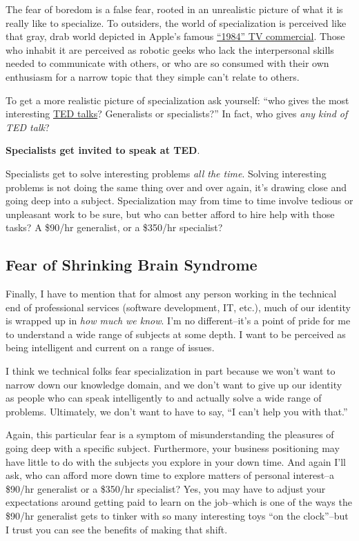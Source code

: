 The fear of boredom is a false fear, rooted in an unrealistic picture of what it is really like to specialize. To outsiders, the world of specialization is perceived like that gray, drab world depicted in Apple's famous \href{http://bit.ly/1xEXr8B}{``1984'' TV commercial}. Those who inhabit it are perceived as robotic geeks who lack the interpersonal skills needed to communicate with others, or who are so consumed with their own enthusiasm for a narrow topic that they simple can't relate to others.

To get a more realistic picture of specialization ask yourself: ``who gives the most interesting \href{http://ted.com}{TED talks}? Generalists or specialists?'' In fact, who gives \emph{any kind of TED talk}?

\textbf{Specialists get invited to speak at TED}.

Specialists get to solve interesting problems \emph{all the time}. Solving interesting problems is not doing the same thing over and over again, it's drawing close and going deep into a subject. Specialization may from time to time involve tedious or unpleasant work to be sure, but who can better afford to hire help with those tasks? A \$90/hr generalist, or a \$350/hr specialist?

\subsection{Fear of Shrinking Brain Syndrome}

Finally, I have to mention that for almost any person working in the technical end of professional services (software development, IT, etc.), much of our identity is wrapped up in \emph{how much we know}. I'm no different--it's a point of pride for me to understand a wide range of subjects at some depth. I want to be perceived as being intelligent and current on a range of issues.

I think we technical folks fear specialization in part because we won't want to narrow down our knowledge domain, and we don't want to give up our identity as people who can speak intelligently to and actually solve a wide range of problems. Ultimately, we don't want to have to say, ``I can't help you with that.''

Again, this particular fear is a symptom of misunderstanding the pleasures of going deep with a specific subject. Furthermore, your business positioning may have little to do with the subjects you explore in your down time. And again I'll ask, who can afford more down time to explore matters of personal interest--a \$90/hr generalist or a \$350/hr specialist? Yes, you may have to adjust your expectations around getting paid to learn on the job--which is one of the ways the \$90/hr generalist gets to tinker with so many interesting toys ``on the clock''--but I trust you can see the benefits of making that shift.

